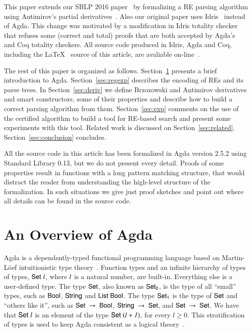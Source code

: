 \documentclass[review]{elsarticle}
\newcommand{\D}[1]{\blue{\mathsf{#1}}}
\newcommand{\V}[1]{\purple{\mathit{#1}}}
\begin{document}
This paper extends our SBLP 2016 paper~\cite{Lopes2016} by formalizing
a RE parsing algorithm using Antimirov's partial
derivatives~\cite{Antimirov1996}.  Also our original paper uses
Idris~\cite{Brady2013} instead of Agda. This change was motivated by a
modification in Idris totality checker that refuses some (correct and
total) proofs that are both accepted by Agda's and Coq totality
checkers. All source code produced in Idris, Agda and Coq, including
the \LaTeX~ source of this article, are avaliable
on-line~\cite{regex-rep}.

The rest of this paper is organized as follows. Section~\ref{sec:agda}
presents a brief introduction to Agda. Section~\ref{sec:regexp}
describes the encoding of REs and its parse trees. In
Section~\ref{sec:deriv} we define Brzozowski and Antimirov derivatives
and smart constructors, some of their properties and describe how to
build a correct parsing algorithm from them. Section~\ref{sec:exp}
comments on the use of the certified algorithm to build a tool for
RE-based search and present some experiments with this tool. Related
work is discussed on
Section~\ref{sec:related}. Section~\ref{sec:conclusion} concludes.

All the source code in this article has been formalized in Agda
version 2.5.2 using Standard Library 0.13, but
we do not present every detail. Proofs of some properties result in
functions with a long pattern matching structure, that would distract
the reader from understanding the high-level structure of the
formalization. In such situations we give just proof sketches and point
out where all details can be found in the source code.

\section{An Overview of Agda}\label{sec:agda}


Agda is a dependently-typed functional programming language based on
Martin-L\"oef intuitionistic type theory~\cite{Lof98}.  Function types
and an infinite hierarchy of types of types, \ensuremath{\D{Set}\;\V{l}}, where \ensuremath{\V{l}} is a
natural number, are built-in. Everything else is a user-defined
type. The type \ensuremath{\D{Set}}, also known as \ensuremath{\D{Set}_{\D{0}}}, is the type of all
``small'' types, such as \ensuremath{\D{Bool}}, \ensuremath{\D{String}} and \ensuremath{\D{List}\;\D{Bool}}.  The type
\ensuremath{\D{Set}_{\D{1}}} is the type of \ensuremath{\D{Set}} and ``others like it'', such as \ensuremath{\D{Set}\;\to \;\D{Bool}}, \ensuremath{\D{String}\;\to \;\D{Set}}, and \ensuremath{\D{Set}\;\to \;\D{Set}}. We have that \ensuremath{\D{Set}\;\V{l}} is an
element of the type \ensuremath{\D{Set}\;(\V{l+1})}, for every $l≥0$. This
stratification of types is used to keep Agda consistent as a logical
theory~\cite{Sorensen2006}.
\end{document}
